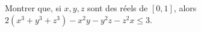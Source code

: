 Montrer que, si $x, y, z$ sont des réels de $[0, 1]$, alors $2(x^3 + y^3 + z^3) - x^2y - y^2z - z^2x \leq 3$.
